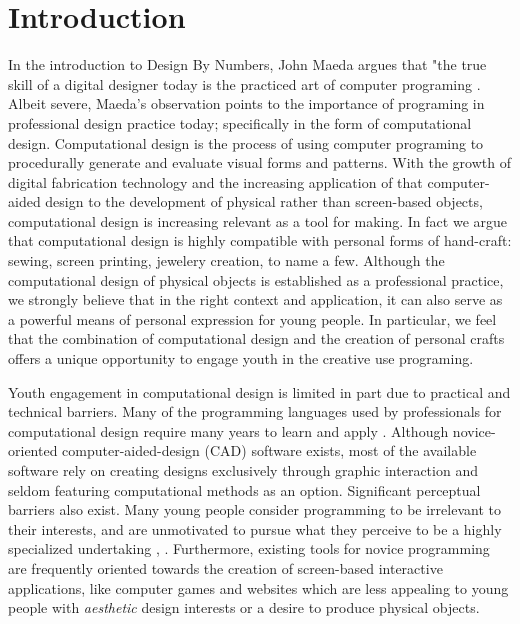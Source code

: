 \documentclass{sigchi}
\begin{document}
\section{Introduction} %
In the introduction to Design By Numbers, John Maeda argues that "the true skill of a digital designer today is the practiced art of computer programing \cite{maeda}. Albeit severe, Maeda's observation points to the importance of programing in professional design practice today; specifically in the form of computational design. Computational design is the process of using computer programing to procedurally generate and evaluate visual forms and patterns. With the growth of digital fabrication technology and the increasing application of that computer-aided design to the development of physical rather than screen-based objects, computational design is increasing relevant as a tool for making. In fact we argue that computational design is highly compatible with personal forms of hand-craft: sewing, screen printing, jewelery creation, to name a few. Although the computational design of physical objects is established as a professional practice, we strongly believe that in the right context and application, it can also serve as a powerful means of personal expression for young people. In particular, we feel that the combination of computational design and the creation of personal crafts offers a unique opportunity to engage youth in the creative use programing.%

Youth engagement in computational design is limited in part due to practical and technical barriers. Many of the programming languages used by professionals for computational design require many years to learn and apply \cite{reas}. Although novice-oriented computer-aided-design (CAD) software exists, most of the available software rely on creating designs exclusively through graphic interaction and seldom featuring computational methods as an option. Significant perceptual barriers also exist. Many young people consider programming to be irrelevant to their interests, and are unmotivated to pursue what they perceive to be a highly specialized undertaking \cite{resnick1}, \cite{introductory_programming}. Furthermore, existing tools for novice programming are frequently oriented towards the creation of screen-based interactive applications, like computer games and websites which are less appealing to young people with \textit{aesthetic} design interests or a desire to produce physical objects.
\end{document}
